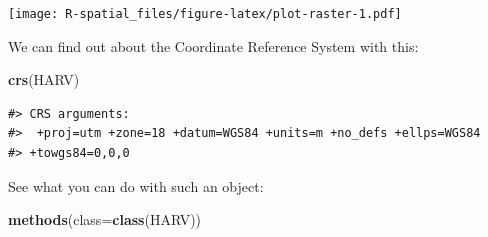 \documentclass[]{book}
\newenvironment{Shaded}{\begin{snugshade}}{\end{snugshade}}
\newcommand{\KeywordTok}[1]{\textcolor[rgb]{0.13,0.29,0.53}{\textbf{#1}}}
\newcommand{\DataTypeTok}[1]{\textcolor[rgb]{0.13,0.29,0.53}{#1}}
\newcommand{\NormalTok}[1]{#1}
\begin{document}
\texttt{[image: R-spatial\_files/figure-latex/plot-raster-1.pdf]}

We can find out about the Coordinate Reference System with this:

\begin{Shaded}
\begin{Highlighting}[]
\KeywordTok{crs}\NormalTok{(HARV)}
\end{Highlighting}
\end{Shaded}

\begin{verbatim}
#> CRS arguments:
#>  +proj=utm +zone=18 +datum=WGS84 +units=m +no_defs +ellps=WGS84
#> +towgs84=0,0,0
\end{verbatim}

See what you can do with such an object:

\begin{Shaded}
\begin{Highlighting}[]
\KeywordTok{methods}\NormalTok{(}\DataTypeTok{class=}\KeywordTok{class}\NormalTok{(HARV))}
\end{Highlighting}
\end{Shaded}
\end{document}
